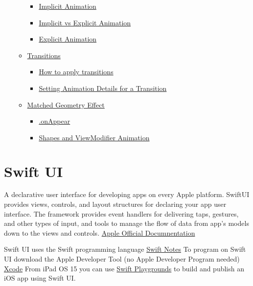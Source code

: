 \documentclass[]{article}
\providecommand{\tightlist}{%
  \setlength{\itemsep}{0pt}\setlength{\parskip}{0pt}}
\begin{document}
\begin{itemize}
\begin{itemize}
    \begin{itemize}
    \tightlist
    \item
      \protect\hyperlink{implicit-animation}{Implicit Animation}
    \item
      \protect\hyperlink{implicit-vs-explicit-animation}{Implicit vs
      Explicit Animation}
    \item
      \protect\hyperlink{explicit-animation}{Explicit Animation}
    \end{itemize}
  \item
    \protect\hyperlink{transitions}{Transitions}

    \begin{itemize}
    \tightlist
    \item
      \protect\hyperlink{how-to-apply-transitions}{How to apply
      transitions}
    \item
      \protect\hyperlink{setting-animation-details-for-a-transition}{Setting
      Animation Details for a Transition}
    \end{itemize}
  \item
    \protect\hyperlink{matched-geometry-effect}{Matched Geometry Effect}

    \begin{itemize}
    \tightlist
    \item
      \protect\hyperlink{onappear}{.onAppear}
    \item
      \protect\hyperlink{shapes-and-viewmodifier-animation}{Shapes and
      ViewModifier Animation}
    \end{itemize}
  \end{itemize}
\end{itemize}

\hypertarget{swift-ui}{%
\section{Swift UI}\label{swift-ui}}

A declarative user interface for developing apps on every Apple
platform. SwiftUI provides views, controls, and layout structures for
declaring your app user interface. The framework provides event handlers
for delivering taps, gestures, and other types of input, and tools to
manage the flow of data from app's models down to the views and
controls.
\href{https://developer.apple.com/documentation/swiftui/}{Apple Official
Documnentation}

Swift UI uses the Swift programming language
\href{https://github.com/nick88msn/swift-starter-kit}{Swift Notes} To
program on Swift UI download the Apple Developer Tool (no Apple
Developer Program needed)
\href{https://apps.apple.com/us/app/xcode/id497799835?mt=12}{Xcode} From
iPad OS 15 you can use
\href{https://apps.apple.com/app/id908519492}{Swift Playgrounds} to
build and publish an iOS app using Swift UI.
\end{document}
